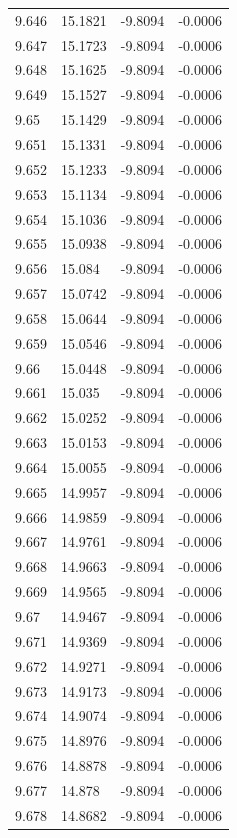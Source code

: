 \begin{tabular}{llll}
9.646 & 15.1821 & -9.8094 & -0.0006 \\
9.647 & 15.1723 & -9.8094 & -0.0006 \\
9.648 & 15.1625 & -9.8094 & -0.0006 \\
9.649 & 15.1527 & -9.8094 & -0.0006 \\
9.65 & 15.1429 & -9.8094 & -0.0006 \\
9.651 & 15.1331 & -9.8094 & -0.0006 \\
9.652 & 15.1233 & -9.8094 & -0.0006 \\
9.653 & 15.1134 & -9.8094 & -0.0006 \\
9.654 & 15.1036 & -9.8094 & -0.0006 \\
9.655 & 15.0938 & -9.8094 & -0.0006 \\
9.656 & 15.084 & -9.8094 & -0.0006 \\
9.657 & 15.0742 & -9.8094 & -0.0006 \\
9.658 & 15.0644 & -9.8094 & -0.0006 \\
9.659 & 15.0546 & -9.8094 & -0.0006 \\
9.66 & 15.0448 & -9.8094 & -0.0006 \\
9.661 & 15.035 & -9.8094 & -0.0006 \\
9.662 & 15.0252 & -9.8094 & -0.0006 \\
9.663 & 15.0153 & -9.8094 & -0.0006 \\
9.664 & 15.0055 & -9.8094 & -0.0006 \\
9.665 & 14.9957 & -9.8094 & -0.0006 \\
9.666 & 14.9859 & -9.8094 & -0.0006 \\
9.667 & 14.9761 & -9.8094 & -0.0006 \\
9.668 & 14.9663 & -9.8094 & -0.0006 \\
9.669 & 14.9565 & -9.8094 & -0.0006 \\
9.67 & 14.9467 & -9.8094 & -0.0006 \\
9.671 & 14.9369 & -9.8094 & -0.0006 \\
9.672 & 14.9271 & -9.8094 & -0.0006 \\
9.673 & 14.9173 & -9.8094 & -0.0006 \\
9.674 & 14.9074 & -9.8094 & -0.0006 \\
9.675 & 14.8976 & -9.8094 & -0.0006 \\
9.676 & 14.8878 & -9.8094 & -0.0006 \\
9.677 & 14.878 & -9.8094 & -0.0006 \\
9.678 & 14.8682 & -9.8094 & -0.0006 \\

\end{tabular}
